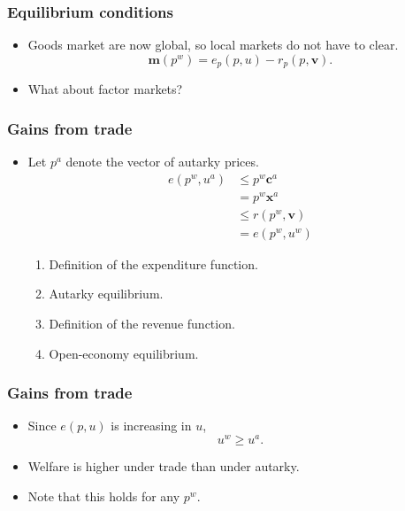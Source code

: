 \documentclass[compress,mathserif,aspectratio=169]{beamer}
\begin{document}
\begin{frame}\frametitle{Equilibrium conditions}\hypertarget{Equilibrium conditions}{}
\begin{itemize}
\item Goods market are now global, so local markets do not have to clear.
\[
\mathbf m(p^w) = e_p(p,u) - r_p(p,\mathbf v).
\]

\item What about factor markets?




\end{itemize}
\end{frame}



\begin{frame}\frametitle{Gains from trade}\hypertarget{Gains from trade}{}
\begin{itemize}
\item Let $p^a$ denote the vector of autarky prices.
\begin{align*}
 e(p^w,u^a) & \le p^w\mathbf c^a\\
    &= p^w\mathbf x^a\\
    &\le r(p^w,\mathbf v)\\
    & = e(p^w,u^w)
\end{align*}
\pause


\begin{enumerate}\setcounter{enumi}{0}
\item Definition of the expenditure function.

\item Autarky equilibrium.

\item Definition of the revenue function.

\item Open-economy equilibrium.


\end{enumerate}

\end{itemize}
\end{frame}



\begin{frame}\frametitle{Gains from trade}\hypertarget{Gains from trade}{}
\begin{itemize}
\item Since $e(p,u)$ is increasing in $u$,
\[
 u^w\ge u^a.
\]

\item Welfare is higher under trade than under autarky.

\item Note that this holds for any $p^w$.


\end{itemize}
\end{frame}
\end{document}
